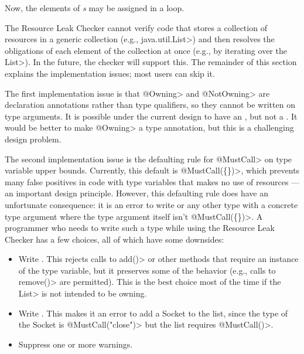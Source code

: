 Now, the elements of \textit{s} may be assigned in a loop.



The Resource Leak Checker cannot verify code that stores a collection of
resources in a generic collection (e.g., \<java.util.List>) and then
resolves the obligations of each element of the collection at once (e.g.,
by iterating over the \<List>).  In the future, the checker will support
this.  The remainder of this section explains the implementation issues;
most users can skip it.

The first implementation issue is that \<@Owning> and \<@NotOwning> are
declaration annotations rather than type qualifiers, so they cannot be
written on type arguments. It is possible under the current design to have
an , but not a .
It would be better to make \<@Owning> a type annotation, but this is a
challenging design problem.

The second implementation issue is the defaulting rule for \<@MustCall> on
type variable upper bounds.  Currently, this default is \<@MustCall(\{\})>,
which prevents many false positives in code with type variables that makes
no use of resources --- an important design principle.
However, this defaulting rule does have an unfortunate consequence: it is
an error to write  or any other type with a concrete
type argument where the type argument itself isn't \<@MustCall(\{\})>. A programmer who
needs to write such a type while using the Resource Leak Checker has a few
choices, all of which have some downsides:

\begin{itemize}
\item Write . This rejects calls to \<add()>
or other methods that require an instance of the type variable, but it
preserves some of the behavior (e.g., calls to \<remove()> are permitted).
This is the best choice most of the time if the \<List> is not intended to
be owning.
\item Write . This makes it an error to
add a Socket to the list, since the type of the Socket is
\<@MustCall("close")> but the list requires \<@MustCall()>.
\item Suppress one or more warnings.
\end{itemize}

